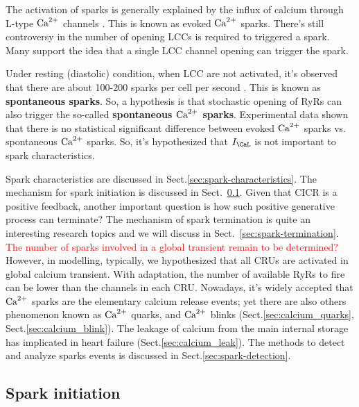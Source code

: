 \begin{framed}  
  The activation of sparks is generally explained by the influx of
  calcium through L-type ${\text{Ca}^{2+}}$ channels \citep{cannell1994snu, cannell1995b}. 
  This is known as evoked ${\text{Ca}^{2+}}$ sparks. There's still controversy in the number
  of opening LCCs is required to triggered a spark. Many support the idea that
  a single LCC channel opening can trigger the spark. 
  
  Under resting (diastolic)  condition, when LCC are not activated, it's
  observed that there are about 100-200 sparks per cell per second
  \citep{cheng1993cse}. This is known as  {\bf spontaneous sparks}. So, a
  hypothesis is that stochastic opening of RyRs can also trigger the so-called
  {\bf spontaneous ${\text{Ca}^{2+}}$ sparks}.
  Experimental data shown that there is no statistical significant difference
  between evoked ${\text{Ca}^{2+}}$ sparks vs.
  spontaneous ${\text{Ca}^{2+}}$ sparks. So, it's hypothesized that $I_\CaL$ is not important
  to spark characteristics.
\end{framed}

Spark characteristics are discussed in Sect.\ref{sec:spark-characteristics}. The
mechanism for spark initiation is discussed in Sect.~\ref{sec:spark-initiation}.
 Given that CICR is a positive feedback, another important question is how such
positive generative process can terminate?  The mechanism of spark termination
is quite an interesting research topics and we will discuss in
Sect.~\ref{sec:spark-termination}.
\textcolor{red}{The number of sparks involved in a global transient
  remain to be determined?} However, in modelling, typically, we hypothesized
  that all CRUs are activated in global calcium transient. With adaptation, the
  number of available RyRs to fire can be lower than the channels in each CRU.
Nowadays, it's widely accepted that ${\text{Ca}^{2+}}$ sparks are the elementary calcium
release events; yet there are also others phenomenon known as ${\text{Ca}^{2+}}$ quarks, and
${\text{Ca}^{2+}}$ blinks (Sect.\ref{sec:calcium_quarks}, Sect.\ref{sec:calcium_blink}). The leakage of
calcium from the main internal storage has implicated in heart failure
(Sect.\ref{sec:calcium_leak}). The methods to detect and analyze sparks events is
discussed in Sect.\ref{sec:spark-detection}.

\subsection{Spark initiation}
\label{sec:spark-initiation}

